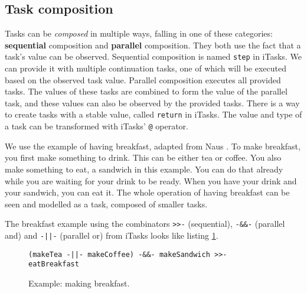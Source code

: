 \subsection{Task composition}\label{section-top-composition}
Tasks can be \textit{composed} in multiple ways, falling in one of these categories: \textbf{sequential} composition and \textbf{parallel} composition. They both use the fact that a task's value can be observed.
Sequential composition is named \texttt{step} in iTasks. We can provide it with multiple continuation tasks, one of which will be executed based on the observed task value.
Parallel composition executes all provided tasks. The values of these tasks are combined to form the value of the parallel task, and these values can also be observed by the provided tasks.
There is a way to create tasks with a stable value, called \texttt{return} in iTasks. The value and type of a task can be transformed with iTasks' \texttt{@} operator.


We use the example of having breakfast, adapted from Naus \cite{naus2020assisting}. To make breakfast, you first make something to drink. This can be either tea or coffee. You also make something to eat, a sandwich in this example. You can do that already while you are waiting for your drink to be ready. When you have your drink and your sandwich, you can eat it. The whole operation of having breakfast can be seen and modelled as a task, composed of smaller tasks.

The breakfast example using the combinators \texttt{>>-} (sequential), \texttt{-&&-} (parallel and) and \texttt{-||-} (parallel or) from iTasks looks like listing \ref{lst:clean_breakfast}.

\begin{figure}[ht]
\centering
\begin{verbatim}
(makeTea -||- makeCoffee) -&&- makeSandwich >>- eatBreakfast
\end{verbatim}
\caption{Example: making breakfast.}
\label{lst:clean_breakfast}
\end{figure}


